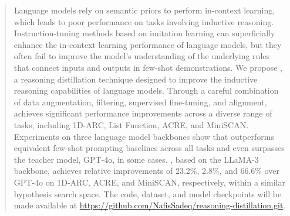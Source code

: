 \begin{abstract}
Language models rely on semantic priors to perform in-context learning, which leads to poor performance on tasks involving inductive reasoning. Instruction-tuning methods based on imitation learning can superficially enhance the in-context learning performance of language models, but they often fail to improve the model's understanding of the underlying rules that connect inputs and outputs in few-shot demonstrations. We propose \proposed, a reasoning distillation technique designed to improve the inductive reasoning capabilities of language models. Through a careful combination of data augmentation, filtering, supervised fine-tuning, and alignment, \proposed achieves significant performance improvements across a diverse range of tasks, including 1D-ARC, List Function, ACRE, and MiniSCAN. Experiments on three language model backbones show that \proposed outperforms equivalent few-shot prompting baselines across all tasks and even surpasses the teacher model, GPT-4o, in some cases. \proposed, based on the LLaMA-3 backbone, achieves relative improvements of 23.2\%, 2.8\%, and 66.6\% over GPT-4o on 1D-ARC, ACRE, and MiniSCAN, respectively, within a similar hypothesis search space. The code, dataset, and model checkpoints will be made available at \url{https://github.com/NafisSadeq/reasoning-distillation.git}.
\end{abstract}